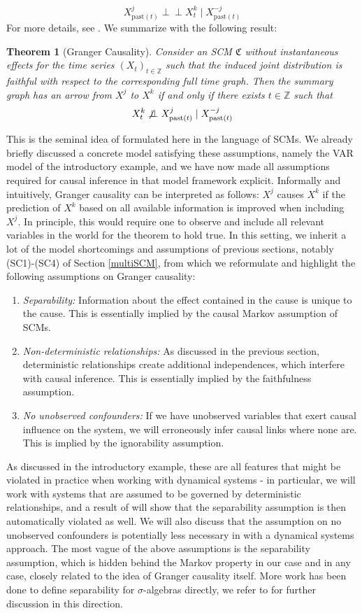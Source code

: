 \documentclass[11pt, a4paper]{memoir}
\theoremstyle{break}
\newtheorem{thm}{Theorem}
\theoremstyle{break}
\theoremstyle{nonumberplain}
\newcommand{\mZ}{\mathbb{Z}}
\newcommand{\indep}{\perp \!\!\! \perp}
\begin{document}
$$X^j_{\text{past}(t)}\indep X_t^k\mid X^{-j}_{\text{past}(t)}$$
For more details, see \cite{Peters}. We summarize with the following result:
\begin{thm}[Granger Causality]
Consider an SCM $\mathfrak{C}$ without instantaneous effects for the time series $(X_t)_{t\in \mZ}$ such that the induced joint distribution is faithful with respect to the corresponding full time graph. Then the summary graph has an arrow from $X^j$ to $X^k$ if and only if there exists $t\in \mZ$ such that
$$X^k_t\centernot\indep X_{\text{past}(t)}^j\mid X^{-j}_{\text{past}(t)}$$
\end{thm}
This is the seminal idea of \cite{Granger} formulated here in the language of SCMs. We already briefly discussed a concrete model satisfying these assumptions, namely the VAR model of the introductory example, and we have now made all assumptions required for causal inference in that model framework explicit. Informally and intuitively, Granger causality can be interpreted as follows: $X^j$ causes $X^k$ if the prediction of $X^k$ based on all available information is improved when including $X^j$. In principle, this would require one to observe and include all relevant variables in the world for the theorem to hold true. In this setting, we inherit a lot of the model shortcomings and assumptions of previous sections, notably (SC1)-(SC4) of Section \ref{multiSCM}, from which we reformulate and highlight the following assumptions on Granger causality:
\begin{enumerate}[itemindent=15pt,label=(GC\arabic*)]
	\item \emph{Separability:} Information about the effect contained in the cause is unique to the cause. This is essentially implied by the causal Markov assumption of SCMs.
	\item \emph{Non-deterministic relationships:} As discussed in the previous section, deterministic relationships create additional independences, which interfere with causal inference. This is essentially implied by the faithfulness assumption.
	\item \emph{No unobserved confounders:} If we have unobserved variables that exert causal influence on the system, we will erroneously infer causal links where none are. This is implied by the ignorability assumption.
\end{enumerate}
As discussed in the introductory example, these are all features that might be violated in practice when working with dynamical systems - in particular, we will work with systems that are assumed to be governed by deterministic relationships, and a result of \cite{Takens} will show that the separability assumption is then automatically violated as well. We will also discuss that the assumption on no unobserved confounders is potentially less necessary in with a dynamical systems approach. The most vague of the above assumptions is the separability assumption, which is hidden behind the Markov property in our case and in any case, closely related to the idea of Granger causality itself. More work has been done to define separability for $\sigma$-algebras directly, we refer to \cite{Sepa} for further discussion in this direction.\\\\
\end{document}
